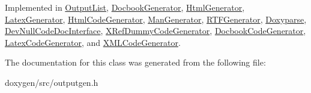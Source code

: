 Implemented in \mbox{\hyperlink{class_output_list_a3cebc68a6a4524ef4b78c4e81d5127eb}{Output\+List}}, \mbox{\hyperlink{class_docbook_generator_a86c6e83addf31b0c377fbe6ecab97769}{Docbook\+Generator}}, \mbox{\hyperlink{class_html_generator_ad21a9b170d8f644619f287a233c6b549}{Html\+Generator}}, \mbox{\hyperlink{class_latex_generator_a0d3d8d57eb16730742b95b4c460cce1f}{Latex\+Generator}}, \mbox{\hyperlink{class_html_code_generator_a6edc5ab4a379a6edfaac4e4c36db4178}{Html\+Code\+Generator}}, \mbox{\hyperlink{class_man_generator_a8ec440b278091bf61579f35cd8237a25}{Man\+Generator}}, \mbox{\hyperlink{class_r_t_f_generator_a06e0455dd78d9d79ea51e6d31e6877fe}{R\+T\+F\+Generator}}, \mbox{\hyperlink{class_doxyparse_a1134b46ed49cafec27797aa1dc24fd25}{Doxyparse}}, \mbox{\hyperlink{class_dev_null_code_doc_interface_a3f251d7e2651aa943adf84c35e27d094}{Dev\+Null\+Code\+Doc\+Interface}}, \mbox{\hyperlink{class_x_ref_dummy_code_generator_ab174d5a290293c32246eb01ccb937645}{X\+Ref\+Dummy\+Code\+Generator}}, \mbox{\hyperlink{class_docbook_code_generator_a5ce309cd68be3ce9eabbd2e522c1c286}{Docbook\+Code\+Generator}}, \mbox{\hyperlink{class_latex_code_generator_a1cda601192d87fe472daccdfbabadfce}{Latex\+Code\+Generator}}, and \mbox{\hyperlink{class_x_m_l_code_generator_afe5258b3e63958ce81ce4895d9ce2334}{X\+M\+L\+Code\+Generator}}.



The documentation for this class was generated from the following file\+:\begin{DoxyCompactItemize}
\item 
doxygen/src/outputgen.\+h\end{DoxyCompactItemize}
